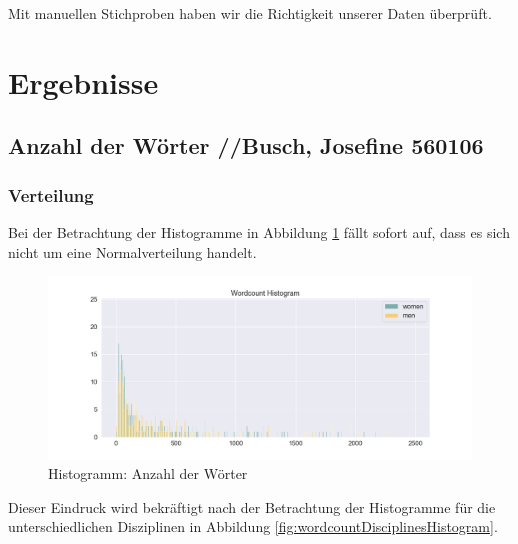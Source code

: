 \documentclass[11pt]{article}
\begin{document}
Mit manuellen Stichproben haben wir die Richtigkeit unserer Daten überprüft.

\section {Ergebnisse}
\subsection {Anzahl der Wörter //Busch, Josefine 560106}
\subsubsection {Verteilung}
Bei der Betrachtung der Histogramme in Abbildung \ref{fig:wordcountHistogram} fällt sofort auf, dass es sich nicht um eine Normalverteilung handelt.

\begin{figure}
\includegraphics[width=1\textwidth]{figures/wordcount_small_bins_histogram.png}
\caption[Histogramm: Anzahl der Wörter]{Histogramm: Anzahl der Wörter}
\label{fig:wordcountHistogram}
\end{figure}

Dieser Eindruck wird bekräftigt nach der Betrachtung der Histogramme für die unterschiedlichen Disziplinen in Abbildung \ref{fig:wordcountDisciplinesHistogram}.
\end{document}

